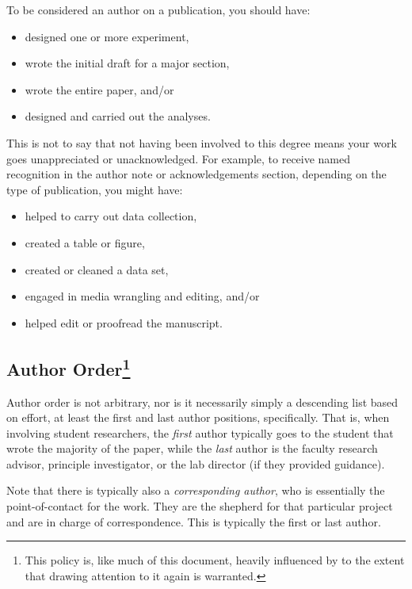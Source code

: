 \documentclass[]{tufte-book}
\providecommand{\tightlist}{%
  \setlength{\itemsep}{0pt}\setlength{\parskip}{0pt}}
\begin{document}
To be considered an author on a publication, you should have:

\begin{itemize}
\tightlist
\item
  designed one or more experiment,
\item
  wrote the initial draft for a major section,
\item
  wrote the entire paper, and/or
\item
  designed and carried out the analyses.
\end{itemize}

This is not to say that not having been involved to this degree means your work goes unappreciated or unacknowledged. For example, to receive named recognition in the author note or acknowledgements section, depending on the type of publication, you might have:

\begin{itemize}
\tightlist
\item
  helped to carry out data collection,
\item
  created a table or figure,
\item
  created or cleaned a data set,
\item
  engaged in media wrangling and editing, and/or
\item
  helped edit or proofread the manuscript.
\end{itemize}

\hypertarget{author-order}{%
\subsection[Author Order]{\texorpdfstring{Author Order\footnote{This policy is, like much of this document, heavily influenced by \citet{Minda_Nielsen_2018} to the extent that drawing attention to it again is warranted.}}{Author Order}}\label{author-order}}

Author order is not arbitrary, nor is it necessarily simply a descending list based on effort, at least the first and last author positions, specifically. That is, when involving student researchers, the \emph{first} author typically goes to the student that wrote the majority of the paper, while the \emph{last} author is the faculty research advisor, principle investigator, or the lab director (if they provided guidance).

Note that there is typically also a \emph{corresponding author}, who is essentially the point-of-contact for the work. They are the shepherd for that particular project and are in charge of correspondence. This is typically the first or last author.
\end{document}
